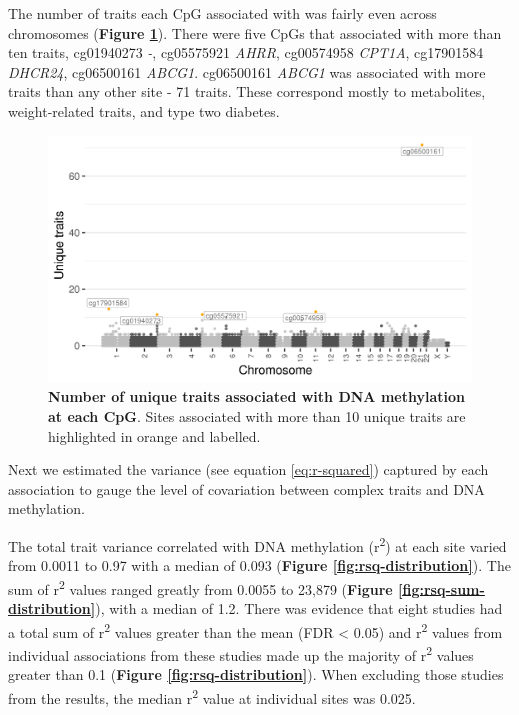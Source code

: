 \documentclass[11pt,oneside]{bristolthesis}
\begin{document}
The number of traits each CpG associated with was fairly even across chromosomes (\textbf{Figure \ref{fig:traits-manhattan}}). There were five CpGs that associated with more than ten traits, cg01940273 \emph{-}, cg05575921 \emph{AHRR}, cg00574958 \emph{CPT1A}, cg17901584 \emph{DHCR24}, cg06500161 \emph{ABCG1}. cg06500161 \emph{ABCG1} was associated with more traits than any other site - 71 traits. These correspond mostly to metabolites, weight-related traits, and type two diabetes.




\begin{figure}

{\centering \includegraphics[width=1\linewidth]{figure/04-properties_of_ewas/traits_per_dmp_at_1e-07} 

}

\caption[Number of unique traits associated with DNA methylation at each CpG]{\textbf{Number of unique traits associated with DNA methylation at each CpG}. Sites associated with more than 10 unique traits are highlighted in orange and labelled.}\label{fig:traits-manhattan}
\end{figure}
Next we estimated the variance (see equation \eqref{eq:r-squared}) captured by each association to gauge the level of covariation between complex traits and DNA methylation.

The total trait variance correlated with DNA methylation (r\textsuperscript{2}) at each site varied from 0.0011 to 0.97 with a median of 0.093 (\textbf{Figure \ref{fig:rsq-distribution}}). The sum of r\textsuperscript{2} values ranged greatly from 0.0055 to 23,879 (\textbf{Figure \ref{fig:rsq-sum-distribution}}), with a median of 1.2. There was evidence that eight studies had a total sum of r\textsuperscript{2} values greater than the mean (FDR \textless{} 0.05) and r\textsuperscript{2} values from individual associations from these studies made up the majority of r\textsuperscript{2} values greater than 0.1 (\textbf{Figure \ref{fig:rsq-distribution}}). When excluding those studies from the results, the median r\textsuperscript{2} value at individual sites was 0.025.
\end{document}
